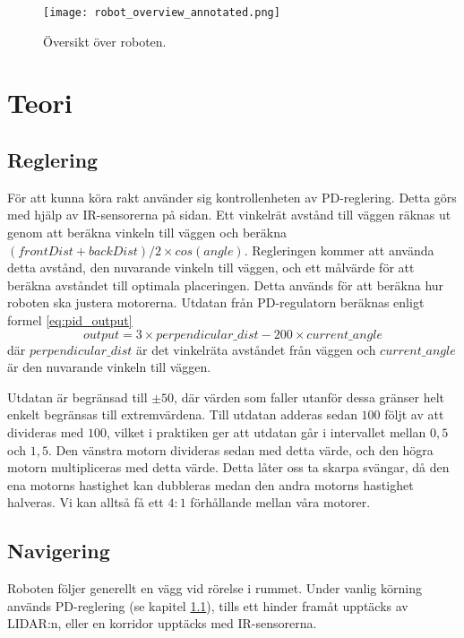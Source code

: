 \documentclass[a4paper,11pt]{article}
\begin{document}
\begin{figure}[h!]
    \centering
    \texttt{[image: robot\_overview\_annotated.png]}
    \caption{Översikt över roboten.}
    \label{fig:robot_overview}
\end{figure}

\clearpage
\section{Teori}
\subsection{Reglering}
\label{ssec:pid}

För att kunna köra rakt använder sig kontrollenheten av PD-reglering. Detta görs med hjälp av IR-sensorerna på sidan. Ett vinkelrät avstånd till väggen räknas ut genom att beräkna vinkeln till väggen och beräkna $ (frontDist+backDist)/2 \times cos(angle)$. Regleringen kommer att använda detta avstånd, den nuvarande vinkeln till väggen, och ett målvärde för att beräkna avståndet till optimala placeringen. Detta används för att beräkna hur roboten ska justera motorerna. Utdatan från PD-regulatorn beräknas enligt formel \ref{eq:pid_output}
\begin{equation}\label{eq:pid_output}
output = 3 \times perpendicular\_dist - 200 \times current\_angle
\end{equation}
där $perpendicular\_dist$ är det vinkelräta avståndet från väggen och $current\_angle$ är den nuvarande vinkeln till väggen.

Utdatan är begränsad till $\pm 50$, där värden som faller utanför dessa gränser helt enkelt begränsas till extremvärdena. Till utdatan adderas sedan $100$ följt av att divideras med $100$, vilket i praktiken ger att utdatan går i intervallet mellan $0,5$ och $1,5$. Den vänstra motorn divideras sedan med detta värde, och den högra motorn multipliceras med detta värde. Detta låter oss ta skarpa svängar, då den ena motorns hastighet kan dubbleras medan den andra motorns hastighet halveras. Vi kan alltså få ett $4:1$ förhållande mellan våra motorer.

\subsection{Navigering}
Roboten följer generellt en vägg vid rörelse i rummet. Under vanlig körning används PD-reglering (se kapitel \ref{ssec:pid}), tills ett hinder framåt upptäcks av LIDAR:n, eller en korridor upptäcks med IR-sensorerna. 
\end{document}
